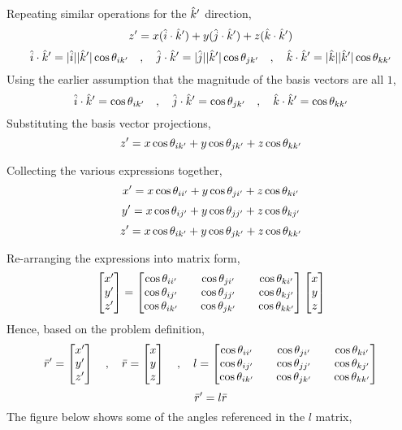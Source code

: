 \documentclass[a4paper, 12pt]{report}
\begin{document}
\begin{center}
Repeating similar operations for the $\hat{k}'$ direction,
$$z' = x(\hat{i}\cdot\hat{k}') + y(\hat{j}\cdot\hat{k}') + z(\hat{k}\cdot\hat{k}')$$
$$\hat{i}\cdot\hat{k}' = |\hat{i}||\hat{k}'|\cos\theta_{ik'} \quad,\quad \hat{j}\cdot\hat{k}' = |\hat{j}||\hat{k}'|\cos\theta_{jk'} \quad,\quad \hat{k}\cdot\hat{k}' = |\hat{k}||\hat{k}'|\cos\theta_{kk'}$$
Using the earlier assumption that the magnitude of the basis vectors are all $1$,
$$\hat{i}\cdot\hat{k}' = \cos\theta_{ik'} \quad,\quad \hat{j}\cdot\hat{k}' = \cos\theta_{jk'} \quad,\quad \hat{k}\cdot\hat{k}' = \cos\theta_{kk'}$$
Substituting the basis vector projections,
$$z' = x\cos\theta_{ik'} + y\cos\theta_{jk'} + z\cos\theta_{kk'}$$

Collecting the various expressions together,
$$x' = x\cos\theta_{ii'} + y\cos\theta_{ji'} + z\cos\theta_{ki'}$$
$$y' = x\cos\theta_{ij'} + y\cos\theta_{jj'} + z\cos\theta_{kj'}$$
$$z' = x\cos\theta_{ik'} + y\cos\theta_{jk'} + z\cos\theta_{kk'}$$

Re-arranging the expressions into matrix form,
$$\begin{bmatrix}
x' \\ y' \\ z'
\end{bmatrix} = \begin{bmatrix}
\cos\theta_{ii'} && \cos\theta_{ji'} && \cos\theta_{ki'} \\
\cos\theta_{ij'} && \cos\theta_{jj'} && \cos\theta_{kj'} \\
\cos\theta_{ik'} && \cos\theta_{jk'} && \cos\theta_{kk'}
\end{bmatrix}\begin{bmatrix}
x \\ y \\ z
\end{bmatrix}$$
Hence, based on the problem definition,
$$\bar{r}' = \begin{bmatrix}
x' \\ y' \\ z'
\end{bmatrix} \quad,\quad \bar{r} = \begin{bmatrix}
x \\ y \\ z
\end{bmatrix} \quad,\quad l = \begin{bmatrix}
\cos\theta_{ii'} && \cos\theta_{ji'} && \cos\theta_{ki'} \\
\cos\theta_{ij'} && \cos\theta_{jj'} && \cos\theta_{kj'} \\
\cos\theta_{ik'} && \cos\theta_{jk'} && \cos\theta_{kk'}
\end{bmatrix}$$
$$\bar{r}' = l \bar{r}$$
The figure below shows some of the angles referenced in the $l$ matrix,
\end{center}
\end{document}

